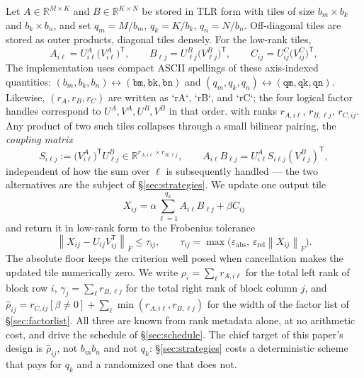 \documentclass[11pt]{article}
\newcommand{\R}{\mathbb{R}}
\newcommand{\T}{\mathsf{T}}
\newcommand{\Fnorm}[1]{\left\|#1\right\|_F}
\begin{document}
Let $A\in\R^{M\times K}$ and $B\in\R^{K\times N}$ be stored in TLR form with
tiles of size $b_m\times b_k$ and $b_k\times b_n$, and set $q_m=M/b_m$,
$q_k=K/b_k$, $q_n=N/b_n$. Off-diagonal tiles are stored as outer products,
diagonal tiles densely. For the low-rank tiles,
\[
A_{i\ell}=U^A_{i\ell}\bigl(V^A_{i\ell}\bigr)^{\T},
\qquad
B_{\ell j}=U^B_{\ell j}\bigl(V^B_{\ell j}\bigr)^{\T},
\qquad
C_{ij}=U^C_{ij}\bigl(V^C_{ij}\bigr)^{\T},
\]
The implementation uses compact ASCII spellings of these axis-indexed quantities:
$(b_m,b_k,b_n)\leftrightarrow(\texttt{bm},\texttt{bk},\texttt{bn})$ and
$(q_m,q_k,q_n)\leftrightarrow(\texttt{qm},\texttt{qk},\texttt{qn})$.
Likewise, $(r_A,r_B,r_C)$ are written as `rA`, `rB`, and `rC`; the four
logical factor handles correspond to $U^A,V^A,U^B,V^B$ in that order.
with ranks $r_{A,i\ell}$, $r_{B,\ell j}$, $r_{C,ij}$. Any product of two such
tiles collapses through a small bilinear pairing, the \emph{coupling matrix}
\begin{equation}
\label{eq:coupling}
S_{i\ell j}:=\bigl(V^A_{i\ell}\bigr)^{\T}U^B_{\ell j}
\in\R^{r_{A,i\ell}\times r_{B,\ell j}},
\qquad
A_{i\ell}B_{\ell j}=U^A_{i\ell}S_{i\ell j}(V^B_{\ell j})^{\T},
\end{equation}
independent of how the sum over $\ell$ is subsequently handled --- the two
alternatives are the subject of \S\ref{sec:strategies}. We update one output
tile
\begin{equation}
\label{eq:update}
X_{ij}=\alpha\sum_{\ell=1}^{q_k}A_{i\ell}B_{\ell j}+\beta C_{ij}
\end{equation}
and return it in low-rank form to the Frobenius tolerance
\begin{equation}
\label{eq:tol}
\Fnorm{X_{ij}-U_{ij}V_{ij}^{\T}}\le\tau_{ij},
\qquad
\tau_{ij}=\max\bigl(\varepsilon_{\mathrm{abs}},\,
\varepsilon_{\mathrm{rel}}\Fnorm{X_{ij}}\bigr).
\end{equation}
The absolute floor keeps the criterion well posed when cancellation makes the
updated tile numerically zero. We write
$\rho_i=\sum_\ell r_{A,i\ell}$ for the total left rank of block row $i$,
$\gamma_j=\sum_\ell r_{B,\ell j}$ for the total right rank of block column $j$,
and
$\hat\rho_{ij}=r_{C,ij}[\beta\ne0]+\sum_\ell\min(r_{A,i\ell},r_{B,\ell j})$
for the width of the factor list of \S\ref{sec:factorlist}. All three are known
from rank metadata alone, at no arithmetic cost, and drive the schedule of
\S\ref{sec:schedule}. The chief target of this paper's design is
$\hat\rho_{ij}$, not $b_mb_n$ and not $q_k$: \S\ref{sec:strategies} costs a
deterministic scheme that pays for $q_k$ and a randomized one that does not.
\end{document}
